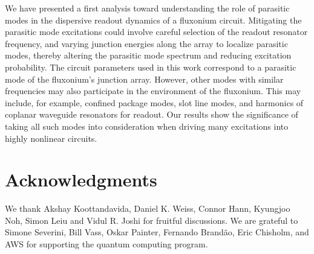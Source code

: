 \documentclass[%
reprint,
superscriptaddress,
 amsmath,amssymb,
 aps,
 prx,
longbibliography,
floatfix,
]{revtex4-2}
\newcommand{\AC}[1]{{\color{blue}{{}[AC: #1]}}}
\begin{document}
We have presented a first analysis toward understanding the role of parasitic modes in the dispersive readout dynamics of a fluxonium circuit. Mitigating the parasitic mode excitations could involve careful selection of the readout resonator frequency, and varying junction energies along the array to localize parasitic modes, thereby altering the parasitic mode spectrum and reducing excitation probability. The circuit parameters used in this work correspond to a parasitic mode of the fluxonium's junction array. However, other modes with similar frequencies may also participate in the environment of the fluxonium. This may include, for example, confined package modes, slot line modes, and harmonics of coplanar waveguide resonators for readout. Our results show the significance of taking all such modes into consideration when driving many excitations into highly nonlinear circuits.  

\AC{End of Aash edits Nov. 11}



\section{Acknowledgments}
 We thank Akshay Koottandavida, Daniel K. Weiss, Connor Hann, Kyungjoo Noh, Simon Leiu and Vidul R. Joshi for fruitful discussions. We are grateful to Simone Severini, Bill Vass, Oskar Painter, Fernando Brand\~ao, Eric Chisholm, and AWS for supporting the quantum computing program. %
\appendix
\end{document}
